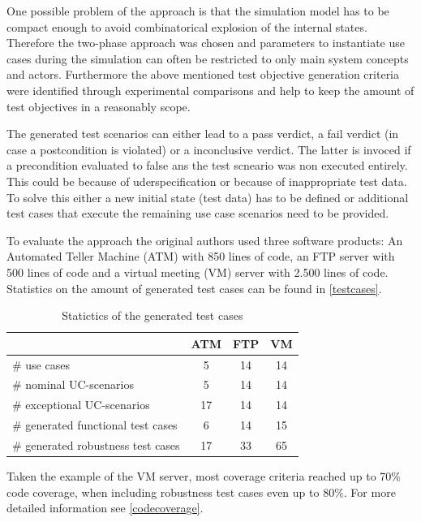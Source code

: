 One possible problem of the approach is that the simulation model has to be compact enough to avoid combinatorical explosion of the internal states. Therefore the two-phase approach was chosen and parameters to instantiate use cases during the simulation can often be restricted to only main system concepts and actors. Furthermore the above mentioned test objective generation criteria were identified through experimental comparisons and help to keep the amount of test objectives in a reasonably scope. 

The generated test scenarios can either lead to a pass verdict, a fail verdict (in case a postcondition is violated) or a inconclusive verdict. The latter is invoced if a precondition evaluated to false ans the test scneario was non executed entirely. This could be because of uderspecification or because of inappropriate test data. To solve this either a new initial state (test data) has to be defined or additional test cases that execute the remaining use case scenarios need to be provided. 

To evaluate the approach the original authors used three software products: An Automated Teller Machine (ATM) with 850 lines of code, an FTP server with 500 lines of code and a virtual meeting (VM) server with 2.500 lines of code. Statistics on the amount of generated test cases can be found in \autoref{testcases}.

\begin{table}[h] 
	\centering
	\begin{small}
		\caption{Statictics of the generated test cases}
		\label{testcases}
		\setlength{\tabcolsep}{1em}
		\begin{tabular}{l|c|c|c}
			\hline
			& \textbf{ATM} & \textbf{FTP} & \textbf{VM} \\
			\hline
			\hline	
			\# use cases & 5 & 14 & 14 \\
			\hline
			\# nominal UC-scenarios & 5 & 14 & 14 \\
			\hline
			\# exceptional UC-scenarios & 17 & 14 & 14 \\
			\hline
			\# generated functional test cases & 6 & 14 & 15 \\
			\hline
			\# generated robustness test cases & 17 & 33 & 65 \\
			\hline
		\end{tabular}
	\end{small}
\end{table}

Taken the example of the VM server, most coverage criteria reached up to 70\% code coverage, when including robustness test cases even up to 80\%. For more detailed information see \autoref{codecoverage}.

